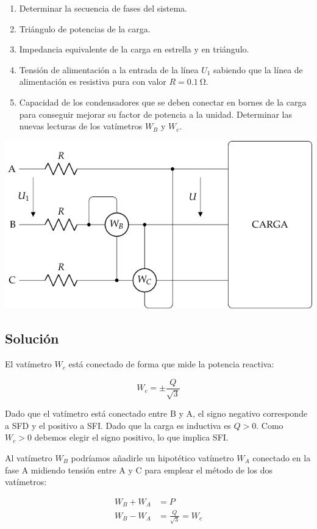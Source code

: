 \begin{enumerate}
\item Determinar la secuencia de fases del sistema.
\item Triángulo de potencias de la carga.
\item Impedancia equivalente de la carga en estrella y
  en triángulo.
\item Tensión de alimentación a la entrada de la línea
  $U_1$ sabiendo que la línea de alimentación es resistiva pura con
  valor $R = \SI{0.1}{\ohm}$.
\item Capacidad de los condensadores que se deben
  conectar en bornes de la carga para conseguir mejorar su factor de
  potencia a la unidad. Determinar las nuevas lecturas de los
  vatímetros $W_B$ y $W_c$.
\end{enumerate}

\begin{center}
  \includegraphics[width=0.6\linewidth]{figuras/BT3_10.pdf}
\end{center}

\subsection*{Solución}

El vatímetro $W_c$ está conectado de forma que mide la potencia
reactiva:

\[
  W_c = \pm \frac{Q}{\sqrt{3}}
\]

Dado que el vatímetro está conectado entre B y A, el signo negativo
corresponde a SFD y el positivo a SFI. Dado que la carga es inductiva
es $Q > 0$. Como $W_c > 0$ debemos elegir el signo positivo, lo que
implica SFI.

Al vatímetro $W_B$ podríamos añadirle un hipotético vatímetro
$W_A$ conectado en la fase A midiendo tensión entre A y C para
emplear el método de los dos vatímetros:


\begin{align*}
W_B + W_A &= P\\
W_B - W_A &= \frac{Q}{\sqrt{3}} = W_c
\end{align*}

